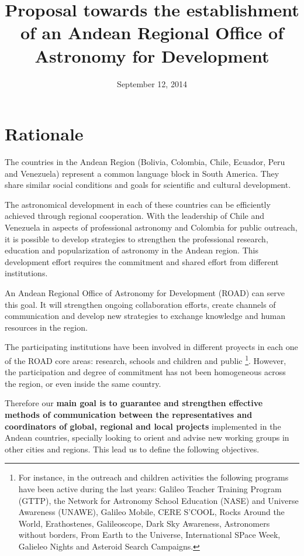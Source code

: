 \documentclass[12pt]{article}
\title{Proposal towards the establishment of an Andean Regional Office of
  Astronomy for Development}
\date{September 12, 2014}
\begin{document}
\maketitle
\tableofcontents
\newpage

\section{Rationale}

The countries in the Andean Region (Bolivia, Colombia, Chile, Ecuador,
Peru and Venezuela) represent a common language block in South
America. They share similar social conditions and goals for scientific
and cultural development.  

The astronomical development in each of these countries can be
efficiently achieved through regional cooperation. With the leadership
of Chile and Venezuela in aspects of professional astronomy and
Colombia for public outreach, it is possible to develop strategies to
strengthen the professional research, education and popularization of
astronomy in the Andean region. This development effort requires the
commitment and shared effort from different institutions. 

An Andean Regional Office of Astronomy for Development (ROAD) can
serve this goal.  It will strengthen ongoing collaboration efforts,
create channels of communication and develop new strategies to
exchange knowledge and human resources in the region.  


The participating institutions have been involved in different
proyects in each one of the ROAD core areas: research, schools and
children and public \footnote{For instance, in the outreach and children activities
  the following programs have been active during the last years: Galileo Teacher Training
  Program (GTTP), the Network for Astronomy School Education (NASE)
  and Universe Awareness (UNAWE), Galileo Mobile, CERE S'COOL, Rocks
  Around the World, Erathostenes, Galileoscope, Dark Sky Awareness,
  Astronomers without borders, From Earth to the Universe,
  International SPace Week, Galieleo Nights and Asteroid Search
  Campaigns.}. However, the participation and degree of commitment
has not been homogeneous across the region, or even inside the same
country. 

Therefore our {\bf main goal is to guarantee and strengthen effective
  methods of communication between the representatives and
  coordinators of global, regional and local projects} implemented  in
the Andean countries, specially looking to orient and advise new
working groups in  other cities and regions. This lead us to define
the following objectives.
\end{document}
